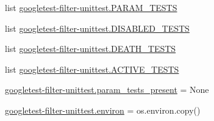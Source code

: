 \begin{DoxyCompactItemize}
\item 
list \mbox{\hyperlink{namespacegoogletest-filter-unittest_a4680842a08f38e6579ce5f1246c23063}{googletest-\/filter-\/unittest.\+P\+A\+R\+A\+M\+\_\+\+T\+E\+S\+TS}}
\item 
list \mbox{\hyperlink{namespacegoogletest-filter-unittest_a3984439b9efcce4230d56a9f91b2c16d}{googletest-\/filter-\/unittest.\+D\+I\+S\+A\+B\+L\+E\+D\+\_\+\+T\+E\+S\+TS}}
\item 
list \mbox{\hyperlink{namespacegoogletest-filter-unittest_aabdb029d6197857aa36347476f031449}{googletest-\/filter-\/unittest.\+D\+E\+A\+T\+H\+\_\+\+T\+E\+S\+TS}}
\item 
list \mbox{\hyperlink{namespacegoogletest-filter-unittest_a9c76128524d4e2787c76acf5c87ebb70}{googletest-\/filter-\/unittest.\+A\+C\+T\+I\+V\+E\+\_\+\+T\+E\+S\+TS}}
\item 
\mbox{\hyperlink{namespacegoogletest-filter-unittest_a2ce0274f4bc360e4067e20ed2bfc439b}{googletest-\/filter-\/unittest.\+param\+\_\+tests\+\_\+present}} = None
\item 
\mbox{\hyperlink{namespacegoogletest-filter-unittest_ad7660cddc4ddfdcae447d8edceddfd4e}{googletest-\/filter-\/unittest.\+environ}} = os.\+environ.\+copy()
\end{DoxyCompactItemize}
